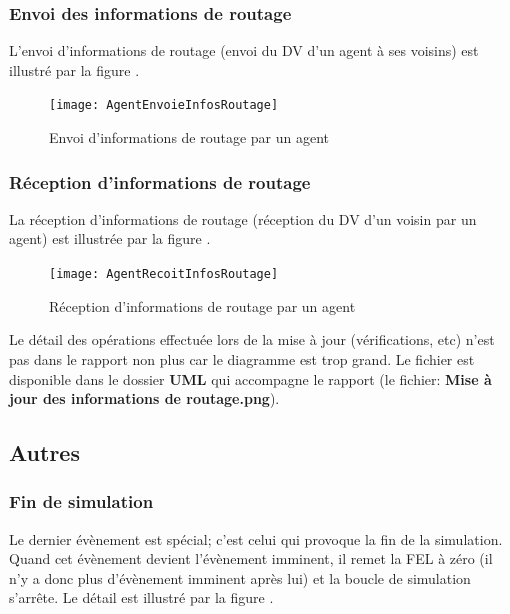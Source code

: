 \documentclass[a4paper,11pt]{article}
\begin{document}
\subsubsection{Envoi des informations de routage}
L'envoi d'informations de routage (envoi du DV d'un agent à ses voisins) est illustré par la figure .

\begin{figure}[h!t]
  \centering
    \texttt{[image: AgentEnvoieInfosRoutage]}
  \caption{Envoi d'informations de routage par un agent}
  \label{fig:agent-envoi-infos-routage}
\end{figure}





\subsubsection{Réception d'informations de routage}
La réception d'informations de routage (réception du DV d'un voisin par un agent) est illustrée par la figure .

\begin{figure}[h!t]
  \centering
    \texttt{[image: AgentRecoitInfosRoutage]}
  \caption{Réception d'informations de routage par un agent}
  \label{fig:agent-recoit-infos-routage}
\end{figure}

Le détail des opérations effectuée lors de la mise à jour (vérifications, etc) n'est pas dans le rapport non plus car le diagramme est trop grand. Le fichier est disponible dans le dossier \textbf{UML} qui accompagne le rapport (le fichier: \textbf{Mise à jour des informations de routage.png}).













\subsection{Autres}

\subsubsection{Fin de simulation}
Le dernier évènement est spécial; c'est celui qui provoque la fin de la simulation. Quand cet évènement devient l'évènement imminent, il remet la FEL à zéro (il n'y a donc plus d'évènement imminent après lui) et la boucle de simulation s'arrête. Le détail est illustré par la figure .
\end{document}
